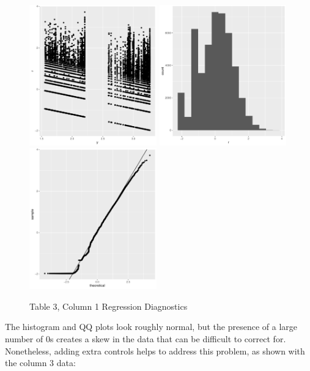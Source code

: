 \documentclass{article}
\begin{document}
\begin{figure}[!hbtp]
\centering
\caption{Table 3, Column 1 Regression Diagnostics}
\includegraphics[width=5.5cm]{../explore/Output/diagnostics/edu_AbsOLS1Plot.pdf}
\includegraphics[width=5.5cm]{../explore/Output/diagnostics/edu_AbsOLS1Hist.pdf}
\includegraphics[width=5.5cm]{../explore/Output/diagnostics/edu_AbsOLS1QQ.pdf}
\end{figure} 

The histogram and QQ plots look roughly normal, but the presence of a large number of 0s creates a skew in the data that can be difficult to correct for. Nonetheless, adding extra controls helps to address this problem, as shown with the column 3 data:
\end{document}
